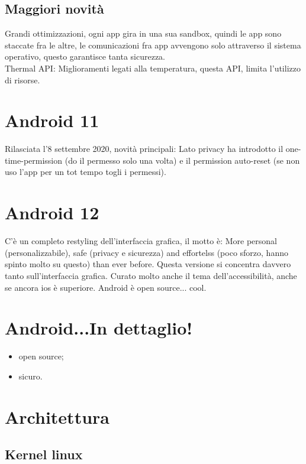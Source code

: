 \newpage

\subsection{Maggiori novità}

Grandi ottimizzazioni, ogni app gira in una sua sandbox, quindi le app sono staccate fra le altre, le comunicazioni fra app avvengono solo attraverso il sistema operativo, questo garantisce tanta sicurezza.\\
Thermal API: Miglioramenti legati alla temperatura, questa API, limita l'utilizzo di risorse.

\section{Android 11}

Rilasciata l'8 settembre 2020, novità principali:
Lato privacy ha introdotto il one-time-permission (do il permesso solo una volta) e il permission auto-reset (se non uso l'app per un tot tempo togli i permessi).

\section{Android 12}

C'è un completo restyling dell'interfaccia grafica, il motto è: More personal (personalizzabile), safe (privacy e sicurezza) and effortelss (poco sforzo, hanno spinto molto su questo) than ever before. Questa versione si concentra davvero tanto sull'interfaccia grafica. Curato molto anche il tema dell'accessibilità, anche se ancora ios è superiore. Android è open source... cool. 

\section{Android...In dettaglio!}

\begin{itemize}
	\item open source;
	\item sicuro.
\end{itemize}

\section{Architettura}

\subsection{Kernel linux}

